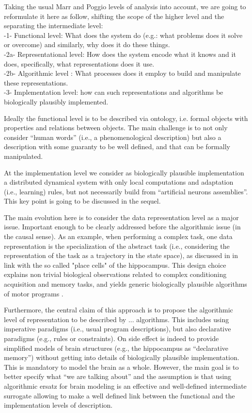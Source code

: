 \documentclass[a4,12pt]{article}
\begin{document}
Taking the usual Marr and Poggio levels of analysis \cite{marr1976understanding} into account, we are going to reformulate it here as follow, shifting the scope of the higher level and the separating the intermediate level:
\\ -1- Functional level: What does the system do (e.g.: what problems does it solve or overcome) and similarly, why does it do these things.
\\ -2a- Representational level: How does the system encode what it knows and it does, specifically, what representations does it use.
\\ -2b- Algorithmic level : What processes does it employ to build and manipulate these representations.
\\ -3- Implementation level: how can such representations and algorithms be biologically plausibly implemented.

Ideally the functional level is to be described via ontology, i.e. formal objects with properties and relations between objects. The main challenge is to not only consider ``human words'' (i.e., a phenomenological description) but also a description with some guaranty to be well defined, and that can be formally manipulated. 

At the implementation level we consider as biologically plausible implementation a distributed dynamical system with only local computations and adaptation (i.e., learning) rules, but not necessarily build from ``artificial neurons assemblies''. This key point is going to be discussed in the sequel.

The main evolution here is to consider the data representation level as a major issue. Important enough to be clearly addressed before the algorithmic issue (in the causal sense). As an example, when performing a complex task, one data representation is the specialization of the abstract task (i.e., considering the representation of the task as a trajectory in the state space), as discussed in \cite{gaussier-revel-etal:02} in link with the so called "place cells" of the hippocampus. This design choice explains non trivial biological observations related to complex conditioning acquisition and memory tasks, and yields generic biologically plausible algorithms of motor programs \cite{connolly-grupen:93,connolly-burns:93,vieville:06e}.
 
Furthermore, the central claim of this approach is to propose the algorithmic level of representation to be described by ... algorithms. This includes using imperative paradigms (i.e., usual program descriptions), but also declarative paradigms (e.g., rules or constraints). On side effect is indeed to provide simplified models of brain structures (e.g., the hippocampus as ``declarative memory'') without getting into details of biologically plausible implementation. This is mandatory to model the brain as a whole. However, the main goal is to better specify what ``we are talking about'' and the assumption is that using algorithmic ersatz for brain modeling is an effective and well-defined intermediate surrogate allowing to make a well defined link between the functional and the implementation levels of description. 
\end{document}
